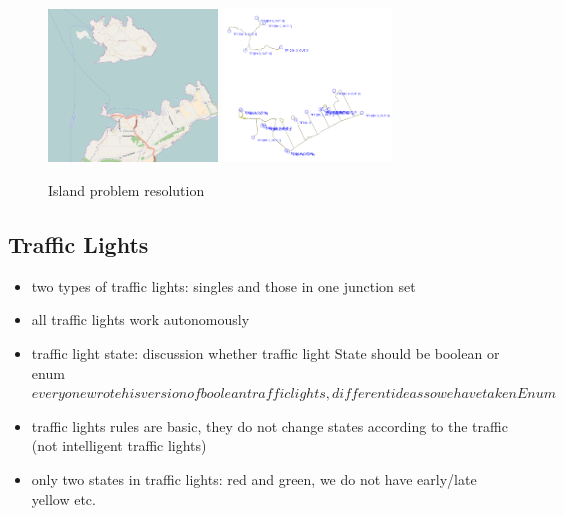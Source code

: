 \begin{itemize}
\begin{figure}[h]
	\vspace{1.5em}
  	\caption{Island problem resolution}
  	\label{fig:islandReal}
  	\centering
	\includegraphics[width=0.4\textwidth]{figs/trafficGenerator/IslandExample_realmap.png}
	\hspace{0.2em}
	\includegraphics[width=0.40\textwidth]{figs/trafficGenerator/IslandExample_simmap.png}
  	\vspace{1.5em}
\end{figure}

\end{itemize}


\subsection{Traffic Lights}
\begin{itemize}
    \item two types of traffic lights: singles and those in one junction set
    \item all traffic lights work autonomously
	\item traffic light state: discussion whether traffic light State should be boolean or enum \(everyone wrote his version of boolean traffic lights, different ideas so we have taken Enum\)
\end{itemize}

\begin{itemize}
        \item traffic lights rules are basic, they do not change states according to the traffic (not intelligent traffic lights)
        \item only two states in traffic lights: red and green, we do not have early/late yellow etc.
\end{itemize}
     
